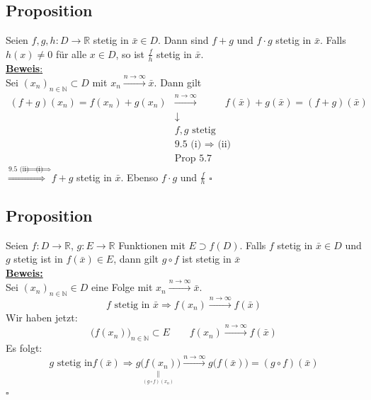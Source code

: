 \subsection{Proposition} %
\label{sub:proposition}
Seien $f,g,h : D \to \mathds{R}$ stetig in $\bar x \in D$. Dann sind $f+g$ und $f \cdot g$ stetig in $\bar x$. Falls 
$h(x)\not= 0$ für alle $x \in D$, so ist $\frac{f}{h}$ stetig in $\bar x$.
\vspace{\baselineskip} \\
\underline{\textbf{Beweis}:} \\
Sei $(x_n)_{n \in \mathds{N}} \subset D$ mit $x_n \xrightarrow{n \to \infty} \bar x$. Dann gilt
\[
	\begin{array}{ccc}
	(f+g)(x_n) = f(x_n) +g(x_n) & \xrightarrow{n \to \infty} & f(\bar x) + g(\bar x) = (f+g)(\bar x) \\
	& \downarrow & \\
	& f,g \text{ stetig} & \\
	& \text{9.5 (i) $\Rightarrow$ (ii)} & \\
	& \text{Prop 5.7} &
	\end{array}
\]
$\overset{\text{9.5 (ii)$\Rightarrow$(i) }}\Longrightarrow $ $f+g$ stetig in $\bar x$. Ebenso $f \cdot g$ und $\frac{f}{h}$
\hfill \( \square \)

\subsection{Proposition} %
\label{sub:proposition}
Seien $f: D \to \mathds{R}$, $g: E \to \mathds{R}$ Funktionen mit $E \supset f(D)$. Falls $f$ stetig in $\bar x \in D$ und $g$
stetig ist in $f(\bar x) \in E$, dann gilt $g \circ f$ ist stetig in $\bar x$
\vspace{\baselineskip} \\
\underline{\textbf{Beweis:}} \\
Sei $(x_n)_{n \in \mathds{N}} \in D$ eine Folge mit $x_n \xrightarrow{n \to \infty} \bar x$.
\[
	f \text{ stetig in } \bar x \Rightarrow f(x_n) \xrightarrow{n \to \infty} f(\bar x)
\]
Wir haben jetzt:
\[
	\big(f(x_n)\big)_{n \in \mathds{N}} \subset E \qquad f(x_n) \xrightarrow{n \to \infty} f(\bar x)
\]
Es folgt:
\[
	g \text{ stetig in} f(\bar x) \Rightarrow \underset{\underset{(g \circ f)(x_n)}{\parallel}}{g\big(f(x_n)\big)} 
	\xrightarrow{n \to \infty} g\big(f(\bar x)\big) = (g \circ f)(\bar x)
\] \hfill \( \square \)

